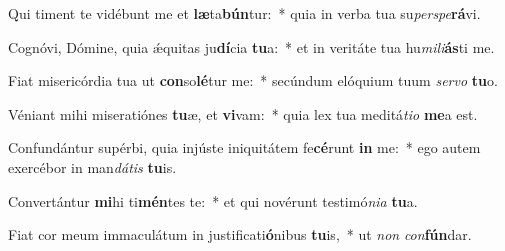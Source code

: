 \item Qui timent te vidébunt me et \textbf{læ}ta\textbf{bún}tur:~* quia in verba tua su\textit{per}\textit{spe}\textbf{rá}vi.
\item Cognóvi, Dómine, quia ǽquitas ju\textbf{dí}cia \textbf{tu}a:~* et in veritáte tua hu\textit{mi}\textit{li}\textbf{ás}ti me.
\item Fiat misericórdia tua ut \textbf{con}so\textbf{lé}tur me:~* secúndum elóquium tuum \textit{ser}\textit{vo} \textbf{tu}o.
\item Véniant mihi miseratiónes \textbf{tu}æ, et \textbf{vi}vam:~* quia lex tua meditá\textit{ti}\textit{o} \textbf{me}a est.
\item Confundántur supérbi, quia injúste iniquitátem fe\textbf{cé}runt \textbf{in} me:~* ego autem exercébor in man\textit{dá}\textit{tis} \textbf{tu}is.
\item Convertántur \textbf{mi}hi ti\textbf{mén}tes te:~* et qui novérunt testimó\textit{ni}\textit{a} \textbf{tu}a.
\item Fiat cor meum immaculátum in justificati\textbf{ó}nibus \textbf{tu}is,~* ut \textit{non} \textit{con}\textbf{fún}dar.

